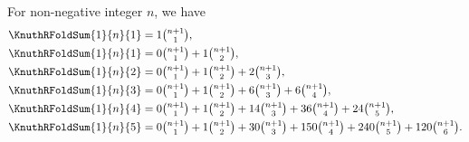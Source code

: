 \begin{example} For non-negative integer $n$, we have
  \begin{align*}
    \KnuthRFoldSum{1}{n}{1} &= 1 \tbinom{n+1}{1},
    \\
    \KnuthRFoldSum{1}{n}{1} &= 0 \tbinom{n+1}{1} + 1 \tbinom{n+1}{2},
    \\
    \KnuthRFoldSum{1}{n}{2} &= 0 \tbinom{n+1}{1} + 1 \tbinom{n+1}{2}
    + 2  \tbinom{n+1}{3},
    \\
    \KnuthRFoldSum{1}{n}{3} &= 0 \tbinom{n+1}{1} + 1 \tbinom{n+1}{2}
    + 6  \tbinom{n+1}{3} + 6   \tbinom{n+1}{4},
    \\
    \KnuthRFoldSum{1}{n}{4} &= 0 \tbinom{n+1}{1} + 1 \tbinom{n+1}{2}
    + 14 \tbinom{n+1}{3} + 36  \tbinom{n+1}{4} + 24  \tbinom{n+1}{5},
    \\
    \KnuthRFoldSum{1}{n}{5} &= 0 \tbinom{n+1}{1} + 1 \tbinom{n+1}{2}
    + 30 \tbinom{n+1}{3} + 150 \tbinom{n+1}{4} + 240 \tbinom{n+1}{5}
    + 120 \tbinom{n+1}{6}.
  \end{align*}
\end{example}
